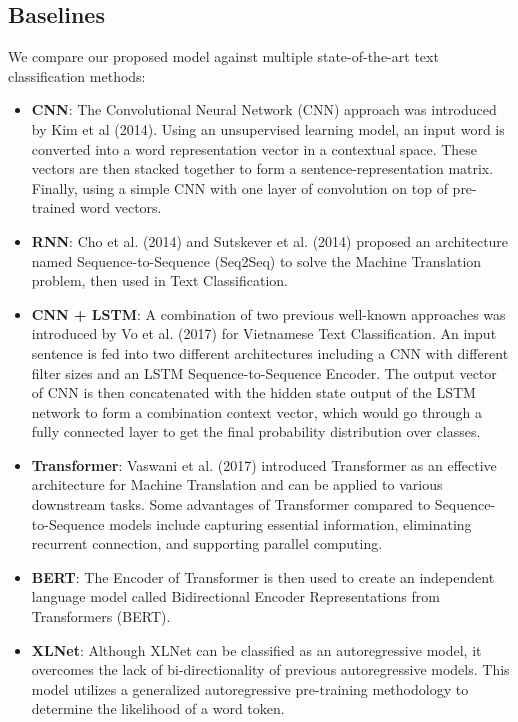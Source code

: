 \documentclass[sn-mathphys,Numbered]{sn-jnl}%
\theoremstyle{thmstyleone}%
\theoremstyle{thmstyletwo}%
\theoremstyle{thmstylethree}%
\begin{document}
\subsection{Baselines}
We compare our proposed model against multiple state-of-the-art text classification methods:
\begin{itemize}
\item \textbf{CNN}: The Convolutional Neural Network (CNN) approach was introduced by Kim et al (2014)\cite{Kim2014}. Using an unsupervised learning model, an input word is converted into a word representation vector in a contextual space. These vectors are then stacked together to form a sentence-representation matrix. Finally, using a simple CNN with one layer of convolution on top of pre-trained word vectors.
\item \textbf{RNN}: Cho et al. (2014) and Sutskever et al. (2014)\cite{Cho2014, Sutskever2014} proposed an architecture named Sequence-to-Sequence (Seq2Seq) to solve the Machine Translation problem, then used in Text Classification.
\item \textbf{CNN + LSTM}: A combination of two previous well-known approaches was introduced by Vo et al. (2017)\cite{Vo2017} for Vietnamese Text Classification. An input sentence is fed into two different architectures including a CNN with different filter sizes and an LSTM Sequence-to-Sequence Encoder. The output vector of CNN is then concatenated with the hidden state output of the LSTM network to form a combination context vector, which would go through a fully connected layer to get the final probability distribution over classes.
\item \textbf{Transformer}: Vaswani et al. (2017)\cite{Vaswani2017} introduced Transformer as an effective architecture for Machine Translation and can be applied to various downstream tasks. Some advantages of Transformer compared to Sequence-to-Sequence models include capturing essential information, eliminating recurrent connection, and supporting parallel computing.
\item \textbf{BERT}: The Encoder of Transformer is then used to create an independent language model called Bidirectional Encoder Representations from Transformers (BERT)\cite{Devlin2019}.
\item \textbf{XLNet}: Although XLNet can be classified as an autoregressive model, it overcomes the lack of bi-directionality of previous autoregressive models. This model utilizes a generalized autoregressive pre-training methodology to determine the likelihood of a word token\cite{Yang2019}.
\end{itemize}
\end{document}
